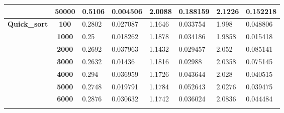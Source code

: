 \documentclass{article}
\begin{document}
\begin{table}[]
\begin{tabular}{|c|c|ll|ll|ll|}
                                           & \textbf{50000}                    & \multicolumn{1}{l|}{0.5106}        & 0.004506                          & \multicolumn{1}{l|}{2.0088}        & 0.188159                          & \multicolumn{1}{l|}{2.1226}        & 0.152218                          \\ \hline
\multirow{15}{*}{\textbf{Quick\_sort}}      & \textbf{100}                      & \multicolumn{1}{l|}{0.2802}        & 0.027087                          & \multicolumn{1}{l|}{1.1646}        & 0.033754                          & \multicolumn{1}{l|}{1.998}         & 0.048806                          \\ \cline{2-8} 
                                           & \textbf{1000}                     & \multicolumn{1}{l|}{0.25}          & 0.018262                          & \multicolumn{1}{l|}{1.1878}        & 0.034186                          & \multicolumn{1}{l|}{1.9858}        & 0.015418                          \\ \cline{2-8} 
                                           & \textbf{2000}                     & \multicolumn{1}{l|}{0.2692}        & 0.037963                          & \multicolumn{1}{l|}{1.1432}        & 0.029457                          & \multicolumn{1}{l|}{2.052}         & 0.085141                          \\ \cline{2-8} 
                                           & \textbf{3000}                     & \multicolumn{1}{l|}{0.2632}        & 0.01436                           & \multicolumn{1}{l|}{1.1816}        & 0.02988                           & \multicolumn{1}{l|}{2.0358}        & 0.075145                          \\ \cline{2-8} 
                                           & \textbf{4000}                     & \multicolumn{1}{l|}{0.294}         & 0.036959                          & \multicolumn{1}{l|}{1.1726}        & 0.043644                          & \multicolumn{1}{l|}{2.028}         & 0.040515                          \\ \cline{2-8} 
                                           & \textbf{5000}                     & \multicolumn{1}{l|}{0.2748}        & 0.019791                          & \multicolumn{1}{l|}{1.1784}        & 0.052643                          & \multicolumn{1}{l|}{2.0276}        & 0.039475                          \\ \cline{2-8} 
                                           & \textbf{6000}                     & \multicolumn{1}{l|}{0.2876}        & 0.030632                          & \multicolumn{1}{l|}{1.1742}        & 0.036024                          & \multicolumn{1}{l|}{2.0836}        & 0.044484                          \\ \cline{2-8} 

\end{tabular}
\end{table}
\end{document}
